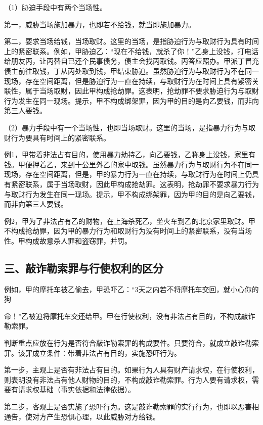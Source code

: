 （1）胁迫手段中有两个当场性。

第一，威胁当场施加暴力，也即若不给钱，就当即施加暴力。

第二，要求当场给钱，当场取财。这里的当场，是指胁迫行为与取财行为具有时间上的紧密联系。例如，甲胁迫乙：“现在不给钱，就杀了你！”乙身上没钱，打电话给朋友丙，让丙替自已还个民事债务，债主会找丙取钱。丙答应照办。甲派丁冒充债主前往取钱，丁从丙处取到钱，甲结束胁迫。虽然胁迫行为与取财行为不在同一现场，存在空间距离，但是胁迫行为一直在持续，与取财行为在时间上具有紧密关联性，属于当场取财，因此甲构成抢劫罪。这表明，抢劫罪不要求胁迫行为与取财行为发生在同一现场。提示，甲不构成绑架罪，因为甲的目的是向乙要钱，而非向第三人要钱。

（2）暴力手段中有一个当场性，也即当场取财。这里的当场，是指暴力行为与取财行为要具有时间上的紧密联系。

例1，甲带着非法占有目的，使用暴力劫持乙，向乙要钱，乙称身上没钱，家里有钱。甲便押着乙，来到十公里外乙的家中取钱。虽然暴力行为与取财行为不在同一现场，存在空间距离，但是，甲的暴力行为一直在持续，与取财行为在时间上仍具有紧密联系，属于当场取财，因此甲构成抢劫罪。这表明，抢劫罪不要求暴力行为与取财行为发生在同一现场。提示，甲不构成绑架罪，因为甲的目的是向乙要钱，而非向第三人要钱。

例2，甲为了非法占有乙的财物，在上海杀死乙，坐火车到乙的北京家里取财。甲不构成抢劫罪，因为甲的暴力行为和取财行为没有时间上的紧密联系，没有当场性。甲构成故意杀人罪和盗窃罪，并罚。

\subsection*{三、敲诈勒索罪与行使权利的区分}

例如，甲的摩托车被乙偷去，甲恐吓乙：“3天之内若不将摩托车交回，就小心你的狗

命！”乙被迫将摩托车交还给甲。甲在行使权利，没有非法占有目的，不构成敲诈勒索罪。

判断重点应放在行为是否符合敲诈勒索罪的构成要件。只要符合，就成立敲诈勒索罪。该罪成立条件：带着非法占有目的，实施恐吓行为。

第一步，主观上是否有非法占有目的。如果行为人具有财产请求权，在行使权利，则表明没有非法占有他人财物的目的，不构成敲诈勒索罪。行为人要有请求权，需要有请求权基础（事实依据和法律依据）。

第二步，客观上是否实施了恐吓行为。这是敲诈勒索罪的实行行为，也即以恶害相通告，使对方产生恐惧心理，以此威胁对方给钱。


